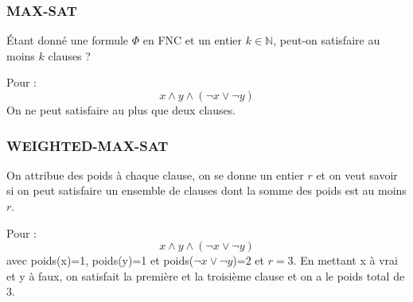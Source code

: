 \subsubsection{MAX-SAT}
Étant donné une formule $\Phi$ en FNC et un entier $k\in\mathbb{N}$, peut-on satisfaire au moins $k$ clauses ?
\begin{example}
    Pour :
    \begin{equation*}
        x \wedge y \wedge (\neg x \vee \neg y)
    \end{equation*}
    On ne peut satisfaire au plus que deux clauses.
\end{example}

\subsubsection{WEIGHTED-MAX-SAT}
On attribue des poids à chaque clause, on se donne un entier $r$ et on veut savoir si on peut satisfaire un ensemble de clauses dont
la somme des poids est au moins $r$.
\begin{example}
    Pour :
    \begin{equation*}
        x \wedge y \wedge (\neg x \vee \neg y)
    \end{equation*}
    avec poids(x)=1, poids(y)=1 et poids($\neg x \vee \neg y$)=2 et $r=3$. En mettant x à vrai et y à faux, on satisfait la première
    et la troisième clause et on a le poids total de 3.
\end{example}